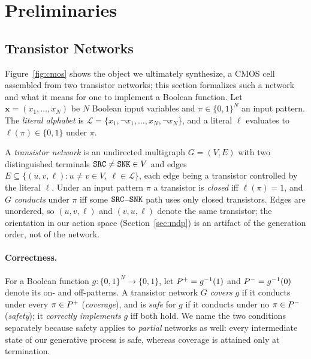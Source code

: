 \section{Preliminaries}
\label{sec:pre}


\subsection{Transistor Networks}
\label{sec:pre_def}
Figure~\ref{fig:cmos} shows the object we ultimately synthesize, a CMOS cell
assembled from two transistor networks; this section formalizes such a network
and what it means for one to implement a Boolean function.
Let $\mathbf{x} = (x_1, \ldots, x_N)$ be $N$ Boolean input variables and
$\pi \in \{0,1\}^N$ an input pattern.
The \emph{literal alphabet} is
$\mathcal{L} = \{x_1, \lnot x_1, \ldots, x_N, \lnot x_N\}$, and a literal
$\ell$ evaluates to $\ell(\pi) \in \{0,1\}$ under $\pi$.

\begin{definition}
\label{def:tnet}
A \emph{transistor network} is an undirected multigraph $G = (V, E)$ with two
distinguished terminals $\texttt{SRC} \neq \texttt{SNK} \in V$ and edges
$E \subseteq \{(u, v, \ell) : u \neq v \in V,\ \ell \in \mathcal{L}\}$, each
edge being a transistor controlled by the literal $\ell$.
Under an input pattern $\pi$ a transistor is \emph{closed} iff
$\ell(\pi) = 1$, and $G$ \emph{conducts} under $\pi$ iff some
$\texttt{SRC}$--$\texttt{SNK}$ path uses only closed transistors.
Edges are unordered, so $(u,v,\ell)$ and $(v,u,\ell)$ denote the same
transistor; the orientation in our action space (Section~\ref{sec:mdp}) is an
artifact of the generation order, not of the network.
\end{definition}

\paragraph{Correctness.}
For a Boolean function $g : \{0,1\}^N \to \{0,1\}$, let $P^{+} = g^{-1}(1)$ and
$P^{-} = g^{-1}(0)$ denote its on- and off-patterns.
A transistor network $G$ \emph{covers} $g$ if it conducts under every
$\pi \in P^{+}$ (\emph{coverage}), and is \emph{safe} for $g$ if it conducts
under no $\pi \in P^{-}$ (\emph{safety}); it \emph{correctly implements} $g$
iff both hold.
We name the two conditions separately because safety applies to \emph{partial}
networks as well: every intermediate state of our generative process is safe,
whereas coverage is attained only at termination.

